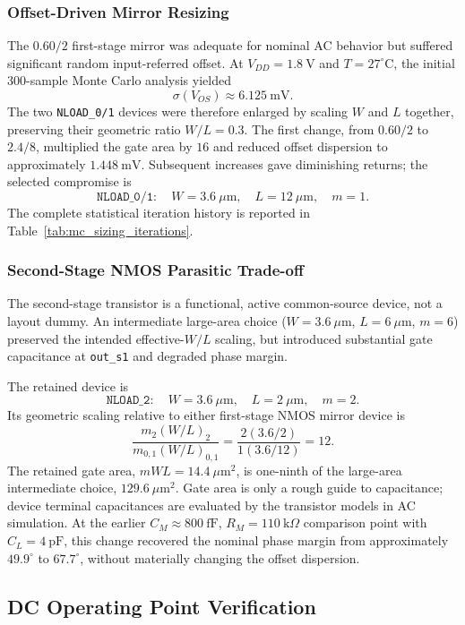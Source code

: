 \subsubsection{Offset-Driven Mirror Resizing}

The $0.60/2$ first-stage mirror was adequate for nominal AC behavior
but suffered significant random input-referred offset. At
$V_{DD}=1.8~\mathrm{V}$ and $T=27^\circ\mathrm{C}$, the initial
$300$-sample Monte Carlo analysis yielded
\[
\sigma(V_{OS})\approx6.125~\mathrm{mV}.
\]
The two \texttt{NLOAD\_0/1} devices were therefore enlarged by scaling
$W$ and $L$ together, preserving their geometric ratio $W/L=0.3$.
The first change, from $0.60/2$ to $2.4/8$, multiplied the gate area
by $16$ and reduced offset dispersion to approximately
$1.448~\mathrm{mV}$. Subsequent increases gave diminishing returns;
the selected compromise is
\[
\boxed{\texttt{NLOAD\_0/1}:\quad W=3.6~\mu\mathrm{m},\quad
L=12~\mu\mathrm{m},\quad m=1.}
\]
The complete statistical iteration history is reported in
Table~\ref{tab:mc_sizing_iterations}.

\subsubsection{Second-Stage NMOS Parasitic Trade-off}

The second-stage transistor is a functional, active common-source
device, not a layout dummy. An intermediate large-area choice
($W=3.6~\mu\mathrm{m}$, $L=6~\mu\mathrm{m}$, $m=6$) preserved the
intended effective-$W/L$ scaling, but introduced substantial gate
capacitance at \texttt{out\_s1} and degraded phase margin.

The retained device is
\[
\boxed{\texttt{NLOAD\_2}:\quad W=3.6~\mu\mathrm{m},\quad
L=2~\mu\mathrm{m},\quad m=2.}
\]
Its geometric scaling relative to either first-stage NMOS mirror
device is
\[
\frac{m_2(W/L)_2}{m_{0,1}(W/L)_{0,1}}
=\frac{2(3.6/2)}{1(3.6/12)}=12.
\]
The retained gate area, $mWL=14.4~\mu\mathrm{m}^2$, is one-ninth of
the large-area intermediate choice, $129.6~\mu\mathrm{m}^2$.
Gate area is only a rough guide to capacitance; device terminal
capacitances are evaluated by the transistor models in AC simulation.
At the earlier $C_M\approx800~\mathrm{fF}$, $R_M=110~\mathrm{k}\Omega$
comparison point with $C_L=4~\mathrm{pF}$, this change recovered the
nominal phase margin from approximately $49.9^\circ$ to
$67.7^\circ$, without materially changing the offset dispersion.

\subsection{DC Operating Point Verification}

